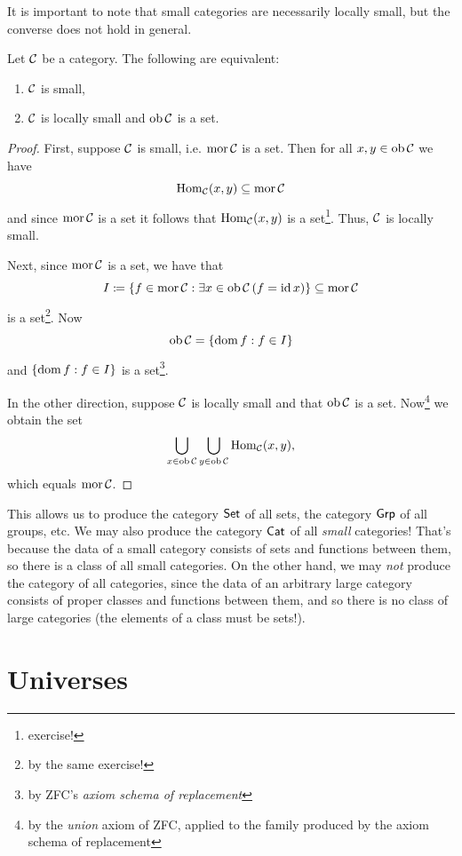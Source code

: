 It is important to note that small categories are necessarily locally small, but the converse does not hold in general.

\begin{proposition}\label{prop:appendix:size issues:small iff locally small with a set of objects}
    Let $\mathcal{C}$ be a category. The following are equivalent:
    \begin{enumerate}
        \item $\mathcal{C}$ is small,
        \item $\mathcal{C}$ is locally small and $\operatorname{ob} \mathcal{C}$ is a set.
    \end{enumerate}
\end{proposition}
\begin{proof}
    First, suppose $\mathcal{C}$ is small, i.e. $\operatorname{mor} \mathcal{C}$ is a set. Then for all $x,y \in \operatorname{ob} \mathcal{C}$ we have
    \[\operatorname{Hom}_{\mathcal{C}}(x,y) \subseteq \operatorname{mor} \mathcal{C}\]
    and since $\operatorname{mor} \mathcal{C}$ is a set it follows that $\operatorname{Hom}_{\mathcal{C}}(x,y)$ is a set\footnote{exercise!}. Thus, $\mathcal{C}$ is locally small.

    Next, since $\operatorname{mor} \mathcal{C}$ is a set, we have that
    \[I \mathrel{\mathop{:}}\mathrel{\mkern-1.2mu}= \{f \in \operatorname{mor} \mathcal{C} : \exists x \in \operatorname{ob} \mathcal{C} \,(f = \operatorname{id} x)\} \subseteq \operatorname{mor} \mathcal{C}\]
    is a set\footnote{by the same exercise!}. Now
    \[\operatorname{ob} \mathcal{C} = \{\operatorname{dom} f : f \in I\}\]
    and $\{\operatorname{dom} f : f \in I\}$ is a set\footnote{by ZFC's \emph{axiom schema of replacement}}.

    In the other direction, suppose $\mathcal{C}$ is locally small and that $\operatorname{ob} \mathcal{C}$ is a set. Now\footnote{by the \emph{union} axiom of ZFC, applied to the family produced by the axiom schema of replacement} we obtain the set
    \[\bigcup_{x \in \operatorname{ob} \mathcal{C}} \bigcup_{y \in \operatorname{ob} \mathcal{C}} \operatorname{Hom}_{\mathcal{C}}(x,y),\]
    which equals $\operatorname{mor} \mathcal{C}$.
\end{proof}

This allows us to produce the category $\mathsf{Set}$ of all sets, the category $\mathsf{Grp}$ of all groups, etc. We may also produce the category $\mathsf{Cat}$ of all \emph{small} categories! That's because the data of a small category consists of sets and functions between them, so there is a class of all small categories. On the other hand, we may \emph{not} produce the category of all categories, since the data of an arbitrary large category consists of proper classes and functions between them, and so there is no class of large categories (the elements of a class must be sets!).

\section{Universes}

